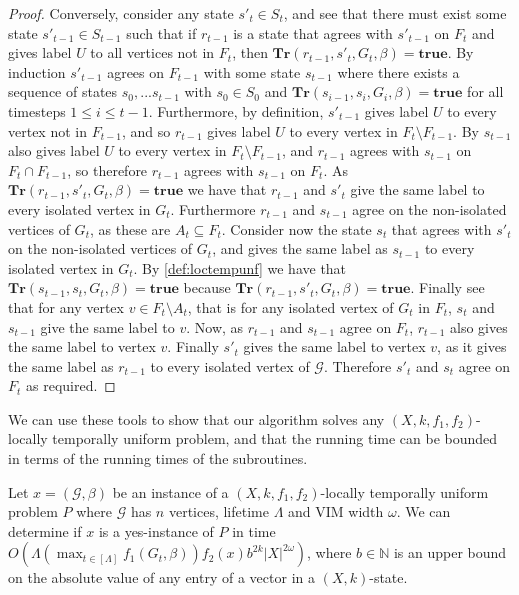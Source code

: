 \documentclass[a4paper,UKenglish,cleveref, autoref, thm-restate]{lipics-v2021} %
\begin{document}
\begin{toappendix}
\begin{proof}
    Conversely, consider any state $s'_t \in S_t$, and see that there must exist some state $s'_{t-1} \in S_{t-1}$ such that if $r_{t-1}$ is a state that agrees with $s'_{t-1}$ on $F_t$ and gives label $U$ to all vertices not in $F_t$, then $\textbf{Tr}(r_{t-1}, s'_t, G_t,\beta)=\textbf{true}$. By induction $s'_{t-1}$ agrees on $F_{t-1}$ with some state $s_{t-1}$ where there exists a sequence of states $s_0, ... s_{t-1}$ with $s_0 \in S_0$ and $\textbf{Tr}(s_{i-1}, s_i, G_i,\beta)=\textbf{true}$ for all timesteps $1 \leq i \leq t-1$. Furthermore, by definition, $s'_{t-1}$ gives label $U$ to every vertex not in $F_{t-1}$, and so $r_{t-1}$ gives label $U$ to every vertex in $F_t \setminus F_{t-1}$. By  $s_{t-1}$ also gives label $U$ to every vertex in $F_t \setminus F_{t-1}$, and $r_{t-1}$ agrees with $s_{t-1}$ on $F_t \cap F_{t-1}$, so therefore $r_{t-1}$ agrees with $s_{t-1}$ on $F_t$. As $\textbf{Tr}(r_{t-1}, s'_t, G_t,\beta)=\textbf{true}$ we have that $r_{t-1}$ and $s'_t$ give the same label to every isolated vertex in $G_t$. Furthermore $r_{t-1}$ and $s_{t-1}$ agree on the non-isolated vertices of $G_t$, as these are $A_t \subseteq F_t$. Consider now the state $s_t$ that agrees with $s'_t$ on the non-isolated vertices of $G_t$, and gives the same label as $s_{t-1}$ to every isolated vertex in $G_t$. By \cref{def:loctempunf} we have that $\textbf{Tr}(s_{t-1}, s_t, G_t,\beta)=\textbf{true}$ because $\textbf{Tr}(r_{t-1}, s'_t, G_t,\beta)=\textbf{true}$. Finally see that for any vertex $v \in F_t \setminus A_t$, that is for any isolated vertex of $G_t$ in $F_t$, $s_t$ and $s_{t-1}$ give the same label to $v$. Now, as $r_{t-1}$ and $s_{t-1}$ agree on $F_t$, $r_{t-1}$ also gives the same label to vertex $v$. Finally $s'_t$ gives the same label to vertex $v$, as it gives the same label as $r_{t-1}$ to every isolated vertex of $\mathcal{G}$. Therefore $s'_t$ and $s_t$ agree on $F_t$ as required.
\end{proof}

We can use these tools to show that our algorithm solves any $(X,k,f_1,f_2)$-locally temporally uniform problem, and that the running time can be bounded in terms of the running times of the subroutines.
\end{toappendix}
\begin{theoremrep}\label{thm:loctempunf}
    Let $x=(\mathcal{G},\beta)$ be an instance of a $(X,k,f_1,f_2)$-locally temporally uniform problem $P$ where $\mathcal{G}$ has $n$ vertices, lifetime $\Lambda$ and VIM width $\omega$.  
    We can determine if $x$ is a yes-instance of $P$ in time $O(\Lambda (\max_{t\in[\Lambda]}f_1(G_t,\beta))f_2(x)b^{2k}|X|^{2\omega})$, where 
    $b \in \mathbb{N}$ is an upper bound on the absolute value of any entry of a vector in a
    $(X,k)$-state.
\end{theoremrep}
\end{document}
